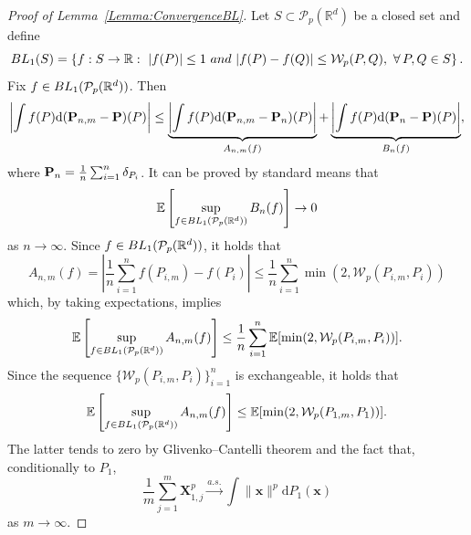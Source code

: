 \documentclass{imsart}
\numberwithin{equation}{section}
\def\R{\mathbb{R}}
\def\E{\mathbb{E}}
\def\x{\mathbf{x}}
\def\X{\mathbf{X}}
\def\E{\mathbb E}
\def\x{\mathbf x}
\begin{document}
\begin{proof}[Proof of Lemma~\ref{Lemma:ConvergenceBL}]
	Let  $S\subset \mathcal{P}_{p}(\R^d) $ be a closed set and define
	$$ {\rm BL}_1(S)=\left\{f:S\to \R : \ |f(P)|\leq 1\ {\rm and}\   |f(P)-f(Q) |\leq \mathcal{W}_{p}(P,Q), \ \forall \, P,Q\in S\right\}. $$
	Fix $f\in  {\rm BL}_1(\mathcal{P}_{p}(\R^d))$. Then 
	$$  \left|\int f(P)\mathrm{d}({\bf P}_{n,m}- {\bf P})(P)\right| \leq \underbrace{\left|\int f(P)\mathrm{d}({\bf P}_{n,m}- {\bf P}_{n})(P)\right|}_{A_{n,m}(f)}+ \underbrace{\left|\int f(P)\mathrm{d}( {\bf P}_{n}- {\bf P})(P)\right|}_{B_{n}(f)}, $$
	where ${\bf P}_{n}=\frac{1}{n}\sum_{i=1}^n \delta_{P_{i}}$.
	It can be proved by standard means that  $$\E\left[\sup_{ f\in  {\rm BL}_1(\mathcal{P}_{p}(\R^d))}B_n(f) \right] \to 0$$ as 
	$n\to \infty$. 
	Since $f\in {\rm BL}_1(\mathcal{P}_{p}(\R^d))$, it holds that  
	$$ A_{n,m}(f)=\left|  \frac{1}{n}\sum_{i=1}^n f(P_{i,m})-f(P_{i})  \right|\leq   \frac{1}{n}\sum_{i=1}^n \min(2,\mathcal{W}_p(P_{i,m},P_{i}))   $$
	which, by taking expectations, implies  
	$$\E\left[\sup_{ f\in  {\rm BL}_1(\mathcal{P}_{p}(\R^d))} A_{n,m}(f)\right] \leq  \frac{1}{n}\sum_{i=1}^n\E[\min(2,\mathcal{W}_p(P_{i,m},P_{i}))] .  $$
	Since the sequence 
	$\{\mathcal{W}_p(P_{i,m},P_{i})\}_{i=1}^n$ is exchangeable, it holds that 
	$$\E\left[\sup_{ f\in  {\rm BL}_1(\mathcal{P}_{p}(\R^d))} A_{n,m}(f)\right] \leq  \E[\min(2,\mathcal{W}_p(P_{1,m},P_{1}))] .  $$
	The latter tends to zero by Glivenko–Cantelli theorem and the fact that, conditionally to $P_1$, 
	$$\frac{1}{m} \sum_{j=1}^m  \X_{1,j}^p \xrightarrow{a.s.}  \int \|\x\|^p \mathrm{d}P_1(\x)  $$
	as $m\to \infty$.
\end{proof}
\end{document}

